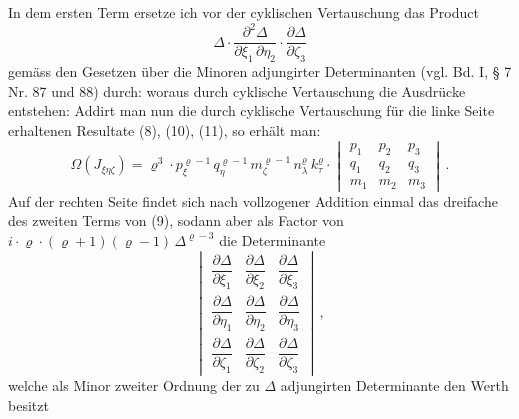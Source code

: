 In dem ersten Term ersetze ich vor der cyklischen Vertauschung das Product
\[
\Delta \cdot \frac{\partial^2 \Delta}{\partial \xi_1\, \partial \eta_2} \cdot \frac{\partial \Delta}{\partial \zeta_3}
\]
gem\"ass den Gesetzen \"uber die Minoren adjungirter Determinanten (vgl. Bd. I, § 7 Nr. 87 und 88) durch:
woraus durch cyklische Vertauschung die Ausdr\"ucke entstehen:
Addirt man nun die durch cyklische Vertauschung f\"ur die linke Seite erhaltenen Resultate (8), (10), (11), so erh\"alt man:
\[
\Omega(J_{\xi\eta\zeta}) = \varrho^3 \cdot p_{\xi}^{\varrho-1}\, q_{\eta}^{\varrho-1}\, m_{\zeta}^{\varrho-1}\, n_{\lambda}^{\varrho}\, k_{\tau}^{\varrho} \cdot
\begin{vmatrix}
p_1 & p_2 & p_3\\
q_1 & q_2 & q_3\\
m_1 & m_2 & m_3
\end{vmatrix}\,.
\]
Auf der rechten Seite findet sich nach vollzogener Addition einmal das dreifache des zweiten Terms von (9), sodann aber als Factor von $i \cdot \varrho \cdot (\varrho+1)(\varrho-1)\, \Delta^{\varrho-3}$ die Determinante
\[
\begin{vmatrix}
\dfrac{\partial \Delta}{\partial \xi_1} & \dfrac{\partial \Delta}{\partial \xi_2} & \dfrac{\partial \Delta}{\partial \xi_3}\\[6pt]
\dfrac{\partial \Delta}{\partial \eta_1} & \dfrac{\partial \Delta}{\partial \eta_2} & \dfrac{\partial \Delta}{\partial \eta_3}\\[6pt]
\dfrac{\partial \Delta}{\partial \zeta_1} & \dfrac{\partial \Delta}{\partial \zeta_2} & \dfrac{\partial \Delta}{\partial \zeta_3}
\end{vmatrix}\,,
\]
welche als Minor zweiter Ordnung der zu $\Delta$ adjungirten Determinante den Werth besitzt
